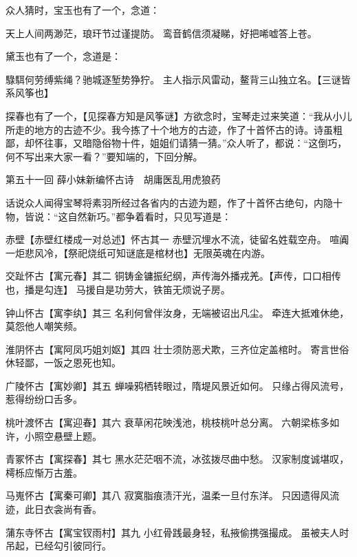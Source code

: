 \documentclass[12pt,oneside]{book}
\begin{document}
众人猜时，宝玉也有了一个，念道：

天上人间两渺茫，琅玕节过谨提防。
鸾音鹤信须凝睇，好把唏嘘答上苍。

黛玉也有了一个，念道是：

騄駬何劳缚紫绳？驰城逐堑势狰狞。
主人指示风雷动，鳌背三山独立名。【三谜皆系风筝也】

探春也有了一个，【见探春方知是风筝谜】方欲念时，宝琴走过来笑道：“我从小儿所走的地方的古迹不少。我今拣了十个地方的古迹，作了十首怀古的诗。诗虽粗鄙，却怀往事，又暗隐俗物十件，姐姐们请猜一猜。”众人听了，都说：“这倒巧，何不写出来大家一看？”要知端的，下回分解。

 







 
第五十一回  薛小妹新编怀古诗　胡庸医乱用虎狼药


话说众人闻得宝琴将素羽所经过各省内的古迹为题，作了十首怀古绝句，内隐十物，皆说：“这自然新巧。”都争着看时，只见写道是：

赤壁【赤壁红楼成一对总述】怀古其一
赤壁沉埋水不流，徒留名姓载空舟。
喧阗一炬悲风冷，【祭祀烧纸可知谜底是棺材也】无限英魂在内游。

交趾怀古【寓元春】其二
铜铸金镛振纪纲，声传海外播戎羌。【声传，口口相传也，播是勾连】
马援自是功劳大，铁笛无烦说子房。

钟山怀古【寓李纨】其三
名利何曾伴汝身，无端被诏出凡尘。
牵连大抵难休绝，莫怨他人嘲笑频。

淮阴怀古【寓阿凤巧姐刘妪】其四
壮士须防恶犬欺，三齐位定盖棺时。
寄言世俗休轻鄙，一饭之恩死也知。

广陵怀古【寓妙卿】其五
蝉噪鸦栖转眼过，隋堤风景近如何。
只缘占得风流号，惹得纷纷口舌多。

桃叶渡怀古【寓迎春】其六
衰草闲花映浅池，桃枝桃叶总分离。
六朝梁栋多如许，小照空悬壁上题。

青冢怀古【寓探春】其七
黑水茫茫咽不流，冰弦拨尽曲中愁。
汉家制度诚堪叹，樗栎应惭万古羞。

马嵬怀古【寓秦可卿】其八
寂寞脂痕渍汗光，温柔一旦付东洋。
只因遗得风流迹，此日衣衾尚有香。

蒲东寺怀古【寓宝钗雨村】其九
小红骨践最身轻，私掖偷携强撮成。
虽被夫人时吊起，已经勾引彼同行。
\end{document}
